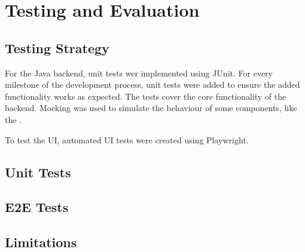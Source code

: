 \chapter{Testing and Evaluation}
  \label{sec:testing}

  \section{Testing Strategy}
  \label{subsec:testing-strategy}

  For the Java backend, unit tests wer implemented using JUnit. For every milestone of the development process, unit tests were added to ensure the added functionality works as expected. The tests cover the core functionality of the backend. Mocking was used to simulate the behaviour of some components, like the .

  To test the UI, automated UI tests were created using Playwright.

  \section{Unit Tests}
  \label{subsec:test-results}

  \section{E2E Tests}
  \label{subsec:performance-evaluation}

  \section{Limitations}
  \label{subsec:user-feedback}